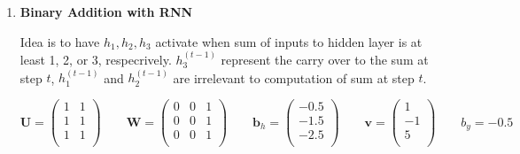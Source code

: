 \documentclass[11pt]{article}
\begin{document}
\begin{enumerate}
    
\item \textbf{Binary Addition with RNN}


Idea is to have $h_1, h_2, h_3$ activate when sum of inputs to hidden layer is at least 1, 2, or 3, respecrively. $h_3^{(t-1)}$ represent the carry over to the sum at step $t$, $h_1^{(t-1)}$ and $h_2^{(t-1)}$ are irrelevant to computation of sum at step $t$.

\[
    \mathbf{U} = 
    \begin{pmatrix}
        1 & 1 \\ 
        1 & 1 \\
        1 & 1 \\
    \end{pmatrix}    
    \qquad 
    \mathbf{W} = 
    \begin{pmatrix}
        0 & 0 & 1 \\
        0 & 0 & 1 \\
        0 & 0 & 1 \\ 
    \end{pmatrix}
    \qquad 
    \mathbf{b}_h = 
    \begin{pmatrix}
        -0.5 \\ -1.5 \\ -2.5 \\
    \end{pmatrix}
    \qquad 
    \mathbf{v} = 
    \begin{pmatrix}
        1 \\ -1 \\ 5 \\ 
    \end{pmatrix}
    \qquad 
    b_y = -0.5
\]






\end{enumerate}
\end{document}
